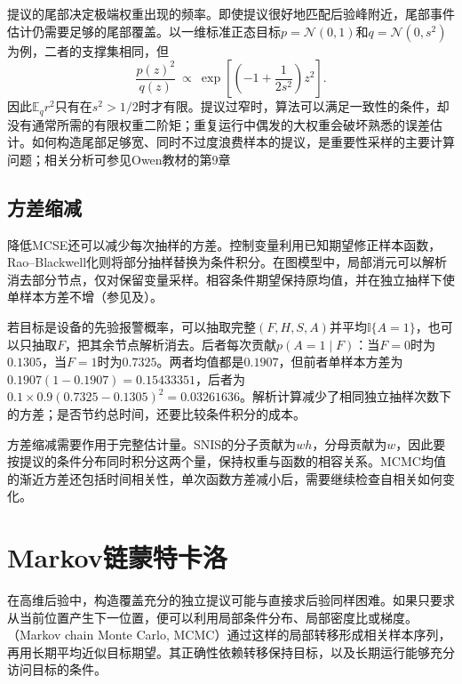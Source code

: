 提议的尾部决定极端权重出现的频率。即使提议很好地匹配后验峰附近，尾部事件估计仍需要足够的尾部覆盖。以一维标准正态目标$p=\mathcal{N}(0,1)$和$q=\mathcal{N}(0,s^2)$为例，二者的支撑集相同，但
\[
  \frac{p(z)^2}{q(z)}
    \ \propto\ \exp\left[\left(-1+\frac{1}{2s^2}\right)z^2\right].
\]
因此$\mathbb{E}_q r^2$只有在$s^2>1/2$时才有限。提议过窄时，算法可以满足一致性的条件，却没有通常所需的有限权重二阶矩；重复运行中偶发的大权重会破坏熟悉的误差估计。如何构造尾部足够宽、同时不过度浪费样本的提议，是重要性采样的主要计算问题；相关分析可参见Owen教材的第9章

\subsection{方差缩减}
\label{sec:pgm-sampling-variance-reduction}

降低MCSE还可以减少每次抽样的方差。控制变量利用已知期望修正样本函数，Rao--Blackwell化则将部分抽样替换为条件积分。在图模型中，局部消元可以解析消去部分节点，仅对保留变量采样。相容条件期望保持原均值，并在独立抽样下使单样本方差不增（参见及）。

若目标是设备的先验报警概率，可以抽取完整$(F,H,S,A)$并平均$\mathbb{I}\{A=1\}$，也可以只抽取$F$，把其余节点解析消去。后者每次贡献$p(A=1\mid F)$：当$F=0$时为$0.1305$，当$F=1$时为$0.7325$。两者均值都是$0.1907$，但前者单样本方差为$0.1907(1-0.1907)=0.15433351$，后者为$0.1\times0.9(0.7325-0.1305)^2=0.03261636$。解析计算减少了相同独立抽样次数下的方差；是否节约总时间，还要比较条件积分的成本。

方差缩减需要作用于完整估计量。SNIS的分子贡献为$wh$，分母贡献为$w$，因此要按提议的条件分布同时积分这两个量，保持权重与函数的相容关系。MCMC均值的渐近方差还包括时间相关性，单次函数方差减小后，需要继续检查自相关如何变化。

\section{Markov链蒙特卡洛}
\label{sec:pgm-sampling-mcmc}

在高维后验中，构造覆盖充分的独立提议可能与直接求后验同样困难。如果只要求从当前位置产生下一位置，便可以利用局部条件分布、局部密度比或梯度。（Markov chain Monte Carlo, MCMC）通过这样的局部转移形成相关样本序列，再用长期平均近似目标期望。其正确性依赖转移保持目标，以及长期运行能够充分访问目标的条件。


